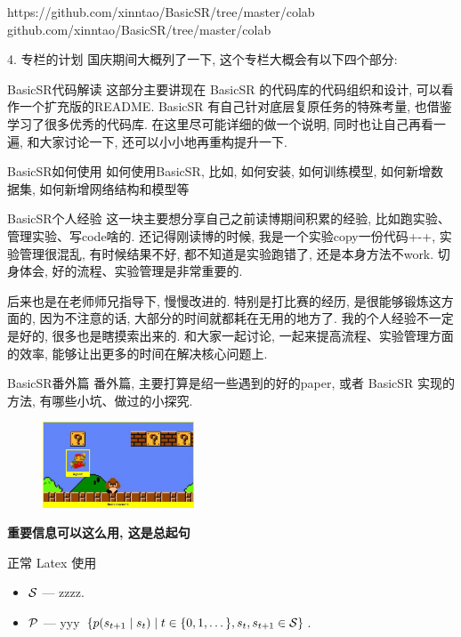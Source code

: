 \documentclass[../main.tex]{subfiles}
\begin{document}
https://github.com/xinntao/BasicSR/tree/master/colab
​github.com/xinntao/BasicSR/tree/master/colab

4. 专栏的计划
国庆期间大概列了一下, 这个专栏大概会有以下四个部分:

BasicSR代码解读
这部分主要讲现在 BasicSR 的代码库的代码组织和设计, 可以看作一个扩充版的README. BasicSR 有自己针对底层复原任务的特殊考量, 也借鉴学习了很多优秀的代码库. 在这里尽可能详细的做一个说明, 同时也让自己再看一遍, 和大家讨论一下, 还可以小小地再重构提升一下.

BasicSR如何使用
如何使用BasicSR, 比如, 如何安装, 如何训练模型, 如何新增数据集, 如何新增网络结构和模型等

BasicSR个人经验
这一块主要想分享自己之前读博期间积累的经验, 比如跑实验、管理实验、写code啥的. 还记得刚读博的时候, 我是一个实验copy一份代码+-+, 实验管理很混乱, 有时候结果不好, 都不知道是实验跑错了, 还是本身方法不work. 切身体会, 好的流程、实验管理是非常重要的.

后来也是在老师师兄指导下, 慢慢改进的. 特别是打比赛的经历, 是很能够锻炼这方面的, 因为不注意的话, 大部分的时间就都耗在无用的地方了. 我的个人经验不一定是好的, 很多也是瞎摸索出来的. 和大家一起讨论, 一起来提高流程、实验管理方面的效率, 能够让出更多的时间在解决核心问题上.

BasicSR番外篇
番外篇, 主要打算是绍一些遇到的好的paper, 或者 BasicSR 实现的方法, 有哪些小坑、做过的小探究.






\begin{figure}
\centering
\includegraphics[width=0.4\textwidth]{figures/agentenv.png}
\end{figure}


\begin{hl} 
	\textbf{重要信息可以这么用, 这是总起句}
	
	正常 Latex 使用
	\begin{itemize}
		\item $\mathcal{S}$ --- zzzz.
		\item $\mathcal{P}$ --- yyy $\{p(s_{t+1} \HM\mid s_t) \HM\mid t \HM\in \{0, 1, \dots \}, s_t, s_{t+1} \HM\in \St\}$.
	\end{itemize}
\end{hl}
\end{document}
